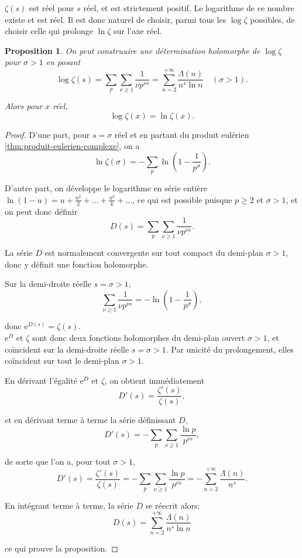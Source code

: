 \documentclass[french]{report}
\newtheorem{proposition}[theorem]{Proposition}
\begin{document}
$\zeta(s)$ est réel pour $s$ réel, et est strictement positif. Le logarithme de ce nombre existe et est réel. Il est donc naturel de choisir, parmi tous les $\log\zeta$ possibles, de choisir celle qui prolonge $\ln\zeta$ sur l'axe réel.

\begin{proposition}\label{prop:log-zeta}
  On peut construuire une détermination holomorphe de $\log\zeta$ pour $\sigma>1$ en posant
  \[
    \log\zeta(s)
    = \sum_p\sum_{\nu\geq1}\frac{1}{\nu p^{\nu s}}
    = \sum_{n=2}^{+\infty}\frac{\Lambda(n)}{n^s\ln n}\quad(\sigma>1).
  \]

  Alors pour $x$ réel,
  \[ \log\zeta(x) = \ln\zeta(x). \]
\end{proposition}

\begin{proof}
  D'une part, pour $s=\sigma$ réel et en partant du produit eulérien \ref{thm:produit-eulerien-complexe}, on a
  \[ \ln\zeta(\sigma) = -\sum_p\ln\left(1-\frac{1}{p^\sigma}\right). \]

  D'autre part, on développe le logarithme en série entière $\ln(1-u)=u+\frac{u^2}{2}+...+\frac{u^k}{k}+...$, ce qui est possible puisque $p\geq2$ et $\sigma>1$, et on peut donc définir
  \[ D(s) = \sum_p\sum_{\nu\geq1}\frac{1}{\nu p^{\nu s}}. \]
  
  La série $D$ est normalement convergente sur tout compact du demi-plan $\sigma>1$, donc y définit une fonction holomorphe.

  Sur la demi-droite réelle $s=\sigma>1$,
  \[ \sum_{\nu\geq1}\frac{1}{\nu p^{\nu s}} = -\ln\left(1-\frac{1}{p^\sigma}\right), \]

  donc $\mathrm{e}^{D(s)}=\zeta(s)$.
  \\
  
  $\mathrm{e}^D$ et $\zeta$ sont donc deux fonctions holomorphes du demi-plan ouvert $\sigma>1$, et coïncident sur la demi-droite réelle $s=\sigma>1$. Par unicité du prolongement, elles coïncident sur tout le demi-plan $\sigma>1$.

  En dérivant l'égalité $\mathrm{e}^D$ et $\zeta$, on obtient immédiatement
  \[ D'(s)=\frac{\zeta'(s)}{\zeta(s)}, \]
  
  et en dérivant terme à terme la série définissant $D$, 
  \[ D'(s) = -\sum_p\sum_{\nu\geq1}\frac{\ln p}{p^{\nu s}}, \]

  de sorte que l'on a, pour tout $\sigma>1$,
  \[
    D'(s)
    = \frac{\zeta'(s)}{\zeta(s)}
    = -\sum_p\sum_{\nu\geq1}\frac{\ln p}{p^{\nu s}}
    = -\sum_{n=2}^{+\infty}\frac{\Lambda(n)}{n^s}.
  \]

  En intégrant terme à terme, la série $D$ se réecrit alors:
  \[ D(s) = \sum_{n=2}^{+\infty}\frac{\Lambda(n)}{n^s\ln n} \]

  ce qui prouve la proposition.
\end{proof}
\end{document}
